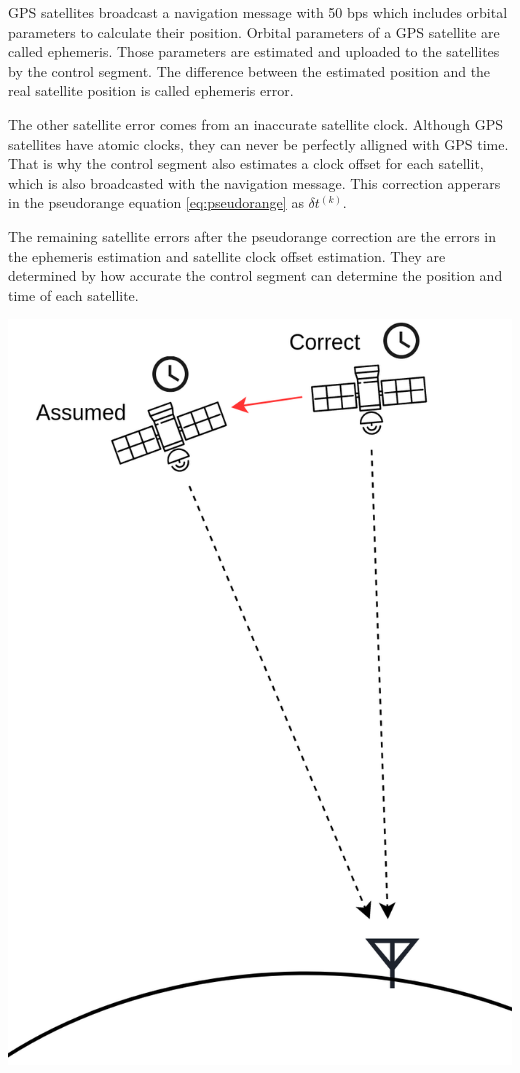 \begin{minipage}{0.6\textwidth}
  GPS satellites broadcast a navigation message with 50 bps which includes orbital parameters to calculate their position.
  Orbital parameters of a GPS satellite are called ephemeris. 
  Those parameters are estimated and uploaded to the satellites by the control segment.
  The difference between the estimated position and the real satellite position is called ephemeris error.
  
  The other satellite error comes from an inaccurate satellite clock.
  Although GPS satellites have atomic clocks, they can never be perfectly alligned with GPS time.
  That is why the control segment also estimates a clock offset for each satellit, which is also broadcasted with the navigation message.
  This correction apperars in the pseudorange equation \ref{eq:pseudorange} as $\delta t^{(k)}$.
  
  The remaining satellite errors after the pseudorange correction are the errors in the ephemeris estimation and satellite clock offset estimation.
  They are determined by how accurate the control segment can determine the position and time of each satellite.
\end{minipage}
\hfill
\begin{minipage}{0.38\textwidth}
 \flushright
 \includegraphics[width=\textwidth]{images/Satellite_Errors.png}
\end{minipage}

